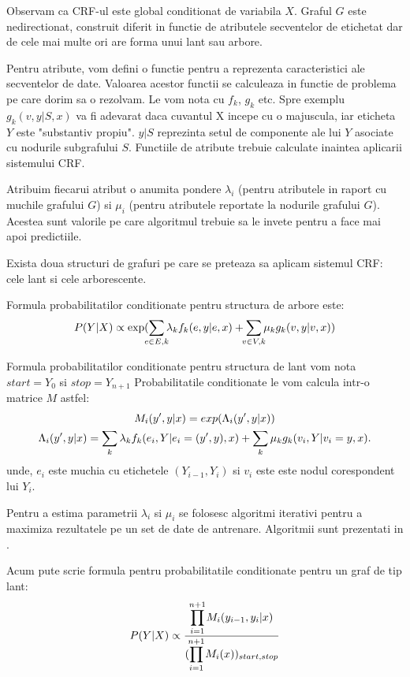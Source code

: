 Observam ca CRF-ul este global conditionat de variabila $X$. Graful $G$ este nedirectionat, construit
diferit in functie de atributele secventelor de etichetat dar de cele mai multe ori are forma unui
lant sau arbore.

Pentru atribute, vom defini o functie pentru a reprezenta caracteristici ale secventelor de date.
Valoarea acestor functii se calculeaza in functie de problema pe care dorim sa o rezolvam. Le vom nota
cu $f_k$, $g_k$ etc. Spre exemplu $g_k(v, y|S, x)$ va fi adevarat daca cuvantul X incepe cu o majuscula,
iar eticheta $Y$ este "substantiv propiu".\cite{crf} $y|S$ reprezinta  setul de componente ale lui $Y$
asociate cu nodurile subgrafului $S$. Functiile de atribute trebuie calculate inaintea aplicarii
sistemului CRF.

Atribuim fiecarui atribut o anumita pondere $\lambda_i$ (pentru atributele in raport cu muchile grafului $G$)
si $\mu_i$ (pentru atributele reportate la nodurile grafului $G$). Acestea sunt valorile pe care algoritmul
trebuie sa le invete pentru a face mai apoi predictiile.

Exista doua structuri de grafuri pe care se preteaza sa aplicam sistemul CRF: cele lant si cele
arborescente.

Formula probabilitatilor conditionate pentru structura de arbore este:
\begin{gather*}
  P(Y|X) \propto \exp(\smashoperator{\sum_{e \in E, k}} \lambda_k f_k(e, y|e, x) + \smashoperator{\sum_{v \in V, k}} \mu_k g_k(v, y|v, x))
\end{gather*}

Formula probabilitatilor conditionate pentru structura de lant vom nota $start = Y_0$ si $stop = Y_{n+1}$
Probabilitatile conditionate le vom calcula intr-o matrice $M$ astfel:
\begin{gather*}
  M_i(y', y|x) = exp(\Lambda_i(y', y|x)) \\
  \Lambda_i(y', y|x) = \smashoperator{\sum_k} \lambda_k f_k(e_i, Y|e_i = (y', y), x) +
                       \smashoperator{\sum_k} \mu_k g_k(v_i, Y|v_i = y, x).
\end{gather*}
unde, $e_i$ este muchia cu etichetele $(Y_{i-1}, Y_i)$ si $v_i$ este este nodul corespondent lui $Y_i$. 

Pentru a estima parametrii $\lambda_i$ si $\mu_i$ se folosesc algoritmi iterativi pentru a maximiza
rezultatele pe un set de date de antrenare. Algoritmii sunt prezentati in \cite{crf}.

Acum pute scrie formula pentru probabilitatile conditionate pentru un graf de tip lant:
\begin{gather*}
  P(Y|X) \propto \frac{\smashoperator{\prod_{i=1}^{n+1}} M_i(y_{i-1}, y_i | x)}{(\smashoperator{\prod_{i=1}^{n+1}} M_i(x))_{start,stop}}
\end{gather*}

